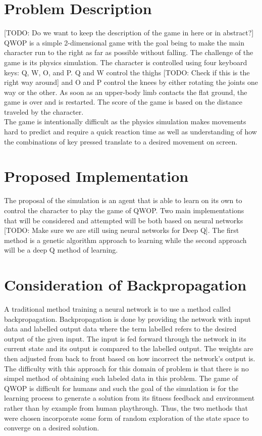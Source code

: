 \documentclass[letterpaper]{article} %
\begin{document}
\section{Problem Description}
[TODO: Do we want to keep the description of the game in here or in abstract?]
QWOP is a simple 2-dimensional game with the goal being to make the main character run to the right as far as possible without falling.
The challenge of the game is its physics simulation.
The character is controlled using four keyboard keys: Q, W, O, and P. Q and W control the thighs [TODO: Check if this is the right way around] and O and P control the knees by either rotating the joints one way or the other.
As soon as an upper-body limb contacts the flat ground, the game is over and is restarted.
The score of the game is based on the distance traveled by the character. \\
\indent The game is intentionally difficult as the physics simulation makes movements hard to predict and require a quick reaction time as well as understanding of how the combinations of key pressed translate to a desired movement on screen.

\section{Proposed Implementation}
The proposal of the simulation is an agent that is able to learn on its own to control the character to play the game of QWOP.
Two main implementations that will be considered and attempted will be both based on neural networks [TODO: Make sure we are still using neural networks for Deep Q].
The first method is a genetic algorithm approach to learning while the second approach will be a deep Q method of learning.


\section{Consideration of Backpropagation}
A traditional method training a neural network is to use a method called backpropagation.
Backpropagation is done by providing the network with input data and labelled output data where the term labelled refers to the desired output of the given input.
The input is fed forward through the network in its current state and its output is compared to the labelled output.
The weights are then adjusted from back to front based on how incorrect the network's output is. \\
\indent The difficulty with this approach for this domain of problem is that there is no simpel method of obtaining such labeled data in this problem.
The game of QWOP is difficult for humans and such the goal of the simulation is for the learning process to generate a solution from its fitness feedback and environment rather than by example from human playthrough.
Thus, the two methods that were chosen incorporate some form of random exploration of the state space to converge on a desired solution.\\
\end{document}
